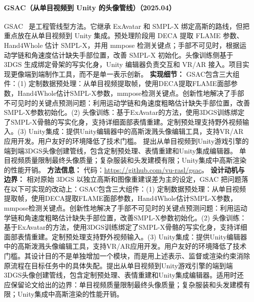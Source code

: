 \paragraph{GSAC（从单目视频到 Unity 的头像管线）（2025.04）}
GSAC~\cite{2504_12999} 是工程管线型方法。它继承 ExAvatar 和 SMPL-X 绑定高斯的路线，但把重点放在从单目视频到 Unity 集成。预处理阶段用 DECA 提取 FLAME 参数、Hand4Whole 估计 SMPL-X，并用 mmpose 检测关键点；手部不可见时，根据运动学链和角速度估计缺失手部位置，改善 SMPL-X 初始化。头像训练侧基于 3DGS 生成绑定骨架的写实化身，Unity 编辑器负责交互和 VR/AR 接入。项目实现更像端到端制作工具，而不是单一表示创新。
\textbf{实现细节：} GSAC包含三大组件：(1) 定制数据预处理：从单目视频提取帧，使用DECA提取FLAME面部参数，Hand4Whole估计SMPL-X参数，mmpose检测关键点。创新性地解决了手部不可见时的关键点预测问题：利用运动学链和角速度粗略估计缺失手部位置，改善SMPL-X参数初始化。(2) 头像训练：基于ExAvatar的方法，使用3DGS训练绑定了SMPL-X骨骼的写实化身，支持详细面部表情重建。定制预处理支持野外视频输入。(3) Unity集成：提供Unity编辑器中的高斯泼溅头像编辑工具，支持VR/AR应用开发。用户友好的环境降低了技术门槛。 提出从单目视频到Unity游戏引擎的端到端3DGS头像创建管线，包含定制预处理、表情重建和Unity集成编辑器。 单目视频质量限制最终头像质量；复杂服装和头发建模有限；Unity集成中高斯渲染的性能开销。
\textbf{方法信息：} 代码：\url{https://github.com/vu-rasl/gsac}。
\textbf{设计动机与边界：} 相对原始 3DGS 以独立高斯和图像重建误差为主的设定，GSAC 把问题落在以下可实现的改动上：GSAC包含三大组件：(1) 定制数据预处理：从单目视频提取帧，使用DECA提取FLAME面部参数，Hand4Whole估计SMPL-X参数，mmpose检测关键点。创新性地解决了手部不可见时的关键点预测问题：利用运动学链和角速度粗略估计缺失手部位置，改善SMPL-X参数初始化。(2) 头像训练：基于ExAvatar的方法，使用3DGS训练绑定了SMPL-X骨骼的写实化身，支持详细面部表情重建。定制预处理支持野外视频输入。(3) Unity集成：提供Unity编辑器中的高斯泼溅头像编辑工具，支持VR/AR应用开发。用户友好的环境降低了技术门槛。其设计目的不是单独增加一个模块，而是用上述表示、监督或渲染约束消除原流程在目标任务中的具体失配。提出从单目视频到Unity游戏引擎的端到端3DGS头像创建管线，包含定制预处理、表情重建和Unity集成编辑器。适用时还应保留论文给出的边界：单目视频质量限制最终头像质量；复杂服装和头发建模有限；Unity集成中高斯渲染的性能开销。
